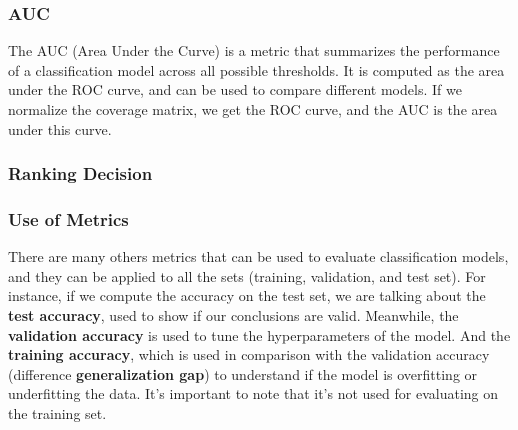 \subsubsection{AUC}
The AUC (Area Under the Curve) is a metric that summarizes the performance of a classification model across all possible thresholds.
It is computed as the area under the ROC curve, and can be used to compare different models.
If we normalize the coverage matrix, we get the ROC curve, and the AUC is the area under this curve.

\subsubsection{Ranking Decision} %

\subsubsection{Use of Metrics}
There are many others metrics that can be used to evaluate classification models, and they can be applied to all the sets (training, validation, and test set).
For instance, if we compute the accuracy on the test set, we are talking about the \textbf{test accuracy}, used to show if our conclusions are valid.
Meanwhile, the \textbf{validation accuracy} is used to tune the hyperparameters of the model.
And the \textbf{training accuracy}, which is used in comparison with the validation accuracy (difference \textbf{generalization gap}) to understand if the model is overfitting or underfitting the data.
It's important to note that it's not used for evaluating on the training set.

\subsection{}